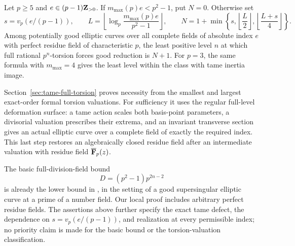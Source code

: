 \begin{corollary}\label{cor:tame-forcing-level}
Let $p\ge5$ and $e\in(p-1)\mathbf Z_{>0}$. If $m_{\max}(p)e<p^2-1$, put $N=0$. Otherwise set
\[
 s=v_p(e/(p-1)),\qquad
 L=\left\lfloor\log_p\frac{m_{\max}(p)e}{p^2-1}\right\rfloor,
 \qquad
 N=1+\min\left\{s,\left\lfloor\frac L2\right\rfloor,
                         \left\lfloor\frac{L+s}{4}\right\rfloor\right\}.
\]
Among potentially good elliptic curves over all complete fields of absolute index $e$ with perfect residue field of characteristic $p$, the least positive level $n$ at which full rational $p^n$-torsion forces good reduction is $N+1$. For $p=3$, the same formula with $m_{\max}=4$ gives the least level within the class with tame inertia image.
\end{corollary}

Section~\ref{sec:tame-full-torsion} proves necessity from the smallest and largest exact-order formal torsion valuations. For sufficiency it uses the regular full-level deformation surface: a tame action scales both basis-point parameters, a divisorial valuation prescribes their extrema, and an invariant transverse section gives an actual elliptic curve over a complete field of exactly the required index. This last step restores an algebraically closed residue field after an intermediate valuation with residue field $\overline{\mathbf F}_p(z)$.

The basic full-division-field bound
\[
 D=(p^2-1)p^{2n-2}
\]
is already the lower bound in \citet[Theorem~1.1, p.~2 of the author version]{Smith2023}, in the setting of a good supersingular elliptic curve at a prime of a number field. Our local proof includes arbitrary perfect residue fields. The assertions above further specify the exact tame defect, the dependence on $s=v_p(e/(p-1))$, and realization at every permissible index; no priority claim is made for the basic bound or the torsion-valuation classification.
